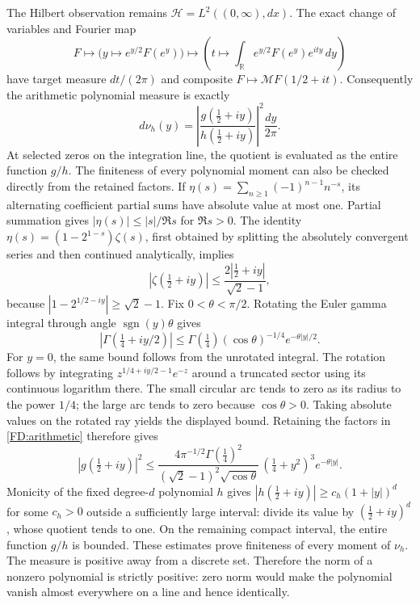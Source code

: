 The Hilbert observation remains
\(\mathcal H=L^2((0,\infty),dx)\).  The exact change of variables and
Fourier map
\[
F\longmapsto \bigl(y\longmapsto e^{y/2}F(e^y)\bigr)
\longmapsto\left(t\longmapsto\int_{\mathbb R}e^{y/2}F(e^y)e^{ity}\,dy\right)
\]
have target measure \(dt/(2\pi)\) and composite
\(F\mapsto\mathcal MF(1/2+it)\).  Consequently the arithmetic polynomial
measure is exactly
\begin{equation}
d\nu_h(y)=\left|\frac{g(\tfrac12+iy)}{h(\tfrac12+iy)}\right|^2
\frac{dy}{2\pi}.
\tag{FD.5}\label{FD:measure}
\end{equation}
At selected zeros on the integration line, the quotient is evaluated as
the entire function \(g/h\).  The finiteness of every polynomial moment
can also be checked directly from the retained factors.  If
\(\eta(s)=\sum_{n\ge1}(-1)^{n-1}n^{-s}\), its alternating coefficient
partial sums have absolute value at most one.  Partial summation gives
\(\lvert\eta(s)\rvert\le\lvert s\rvert/\Re s\) for \(\Re s>0\).
The identity
\(\eta(s)=(1-2^{1-s})\zeta(s)\), first obtained by splitting the
absolutely convergent series and then continued analytically, implies
\[
|\zeta(\tfrac12+iy)|
\le\frac{2|\tfrac12+iy|}{\sqrt2-1},
\]
because \(|1-2^{1/2-iy}|\ge\sqrt2-1\).
Fix \(0<\theta<\pi/2\).  Rotating the Euler gamma integral through
angle \(\operatorname{sgn}(y)\theta\) gives
\[
|\Gamma(\tfrac14+iy/2)|
\le\Gamma(\tfrac14)(\cos\theta)^{-1/4}e^{-\theta|y|/2}.
\]
For \(y=0\), the same bound follows from the unrotated integral.
The rotation follows by integrating
\(z^{1/4+iy/2-1}e^{-z}\) around a truncated sector using its continuous
logarithm there.  The small circular arc tends to zero as its radius
to the power \(1/4\); the large arc tends to zero because
\(\cos\theta>0\).  Taking absolute values on the rotated ray yields
the displayed bound.  Retaining the factors in \eqref{FD:arithmetic}
therefore gives
\[
|g(\tfrac12+iy)|^2
\le
\frac{4\pi^{-1/2}\Gamma(\tfrac14)^2}
{(\sqrt2-1)^2\sqrt{\cos\theta}}\,
(\tfrac14+y^2)^3e^{-\theta|y|}.
\]
Monicity of the fixed degree-\(d\) polynomial \(h\) gives
\(|h(\tfrac12+iy)|\ge c_h(1+|y|)^d\) for some \(c_h>0\) outside
a sufficiently large interval: divide its value by
\((\tfrac12+iy)^d\), whose quotient tends to one.  On the remaining
compact interval, the entire function \(g/h\) is bounded.
These estimates prove finiteness of every moment of \(\nu_h\).
The measure is positive away from a discrete set.
Therefore the norm of a nonzero polynomial is
strictly positive: zero norm would make the polynomial vanish almost
everywhere on a line and hence identically.

